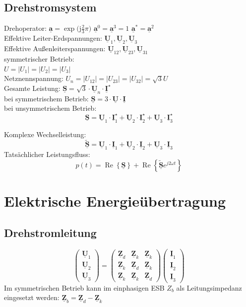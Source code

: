 \documentclass[6pt,a4paper]{scrartcl}
\renewcommand{\vec}[1]{\ensuremath{\underline{\boldsymbol {#1}}}}
\renewcommand{\i}{\ensuremath{\mathrm{j}}}										%
\begin{document}
\begin{multicols}{4}
		\subsection{Drehstromsystem}
		Drehoperator: $\vec a = \exp\bigl(\i \frac{2}{3} \pi \bigr)$ \qquad $\vec a^0 = \vec a^3 = 1$ \quad $\vec a^* = \vec a^2$\\
		
		
		Effektive Leiter-Erdspannungen: $\vec U_1,\vec U_2,\vec U_3$\\
		Effektive Außenleiterspannungen: $\vec U_{12},\vec U_{23},\vec U_{31}$\\
		symmetrischer Betrieb:\\
		$U = |U_1| = |U_2| = |U_3|$\\
		Netznennspannung: $U_n = |U_{12}| = |U_{23}| = |U_{32}| = \sqrt{3} U$\\
		Gesamte Leistung: $\vec S = \sqrt{3} \cdot \vec U_n \cdot \vec I^\star$\\
		bei symmetrischem Betrieb: $\vec S = 3 \cdot \vec U \cdot \vec I$\\
		bei unsymmetrischem Betrieb: 
		\[\vec S = \vec U_1 \cdot \vec I_1^\star + \vec U_2 \cdot \vec I_2^\star + \vec U_3 \cdot \vec I_3^\star\]
		
		Komplexe Wechselleistung:
		\[\tilde{\vec S} = \vec U_1 \cdot \vec I_1 + \vec U_2 \cdot \vec I_2 + \vec U_3 \cdot \vec I_3\]
		Tatsächlicher Leistungsfluss:
		\[p(t) = \operatorname{Re} \left\{ \vec S \right\} + \operatorname{Re} \left\{\tilde{\vec S} e^{j 2 \omega t} \right\}\]
		
	\section{Elektrische Energieübertragung}
	
		\subsection{Drehstromleitung}
		
		
		\[\begin{pmatrix} \vec U_1 \\ \vec U_2 \\ \vec U_3 \end{pmatrix} = \begin{pmatrix} \vec Z_d & \vec Z_k & \vec Z_k \\ \vec Z_k & \vec Z_d & \vec Z_k \\ \vec Z_k & \vec Z_k & \vec Z_d \end{pmatrix} \begin{pmatrix} \vec I_1 \\ \vec I_2 \\ \vec I_3 \end{pmatrix}\]
		Im symmetrischen Betrieb kann im einphasigen ESB $Z_b$ als Leitungsimpedanz eingesetzt werden: $\vec Z_b = \vec Z_d - \vec Z_k$



\end{multicols}
\end{document}
